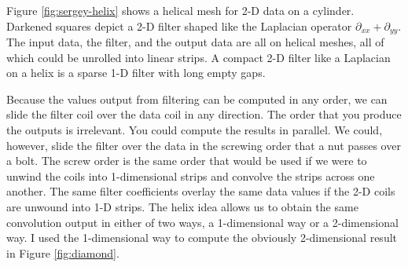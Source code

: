 
Figure \ref{fig:sergey-helix} shows a helical mesh for 2-D data on a cylinder.
Darkened squares depict a 2-D filter
shaped like the Laplacian operator $\partial_{xx}+\partial_{yy}$.
The input data, the filter, and the output data are all on helical meshes,
all of which could be unrolled into linear strips.
A compact 2-D filter like a Laplacian
on a helix is a sparse 1-D filter with long empty gaps.


\par
Because the values output from filtering can be computed
in any order, we can slide the filter coil
over the data coil in any direction.
The order that you produce the outputs is irrelevant.
You could compute the results in parallel.
We could, however, slide the filter over the data in the screwing order
that a nut passes over a bolt.
The screw order is the same order that would be used
if we were to unwind the coils into 1-dimensional strips
and convolve the strips across one another.
The same filter coefficients overlay the same data values
if the 2-D coils are unwound into 1-D strips.
The helix idea allows us to obtain the same convolution output
in either of two ways, a 1-dimensional way or a 2-dimensional way.
I used the 1-dimensional way to compute the obviously 2-dimensional
result in Figure \ref{fig:diamond}.



